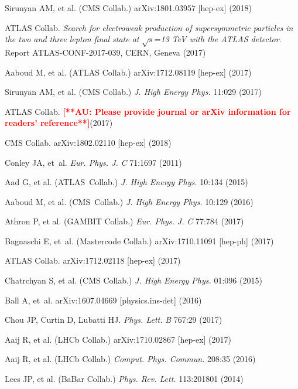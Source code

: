\documentclass{ar-1col}
\begin{document}
\begin{thebibliography}{175}
Sirunyan AM, et al. (CMS Collab.) arXiv:1801.03957 [hep-ex] (2018)

ATLAS Collab. \textit{Search for electroweak production of supersymmetric particles in the two and three lepton final state at} $\sqrt{s}$=\textit{13 TeV with the ATLAS detector}.
Report ATLAS-CONF-2017-039, CERN, Geneva (2017)

Aaboud M, et al. ({ATLAS Collab}.) arXiv:1712.08119 [hep-ex] (2017)

{Sirunyan AM, et al. (CMS Collab}.) \textit{J. High Energy Phys.} 11:029 (2017)

{ATLAS Collab}.  \textbf{\textcolor{red}{[**AU: Please provide journal or arXiv information for readers' reference**]}}(2017)

{CMS Collab}. arXiv:1802.02110 [hep-ex] (2018)

Conley JA, et~al. \textit{Eur. Phys. J.} \textit{C} 71:1697 (2011)

{Aad G, et al. (ATLAS~Collab}.) \textit{J. High Energy Phys.} 10:134 (2015)

{Aaboud M, et al. (CMS~Collab.)} \textit{J. High Energy Phys.} 10:129 (2016)

{Athron P, et al. (GAMBIT Collab}.) \textit{Eur. Phys. J.} \textit{C} 77:784 (2017)

Bagnaschi E, et~al. (Mastercode Collab.) arXiv:1710.11091 [hep-ph] (2017)

{ATLAS Collab}. arXiv:1712.02118 [hep-ex] (2017)

{Chatrchyan S, et al. (CMS Collab}.) \textit{J. High Energy Phys.} 01:096 (2015)

Ball A, et~al. arXiv:1607.04669 [physics.ins-det] (2016)

Chou JP, Curtin D, Lubatti HJ. \textit{Phys. Lett.} \textit{B} 767:29 (2017)

{Aaij R, et al. (LHCb Collab}.) arXiv:1710.02867 [hep-ex] (2017)

{Aaij R, et al. (LHCb Collab}.) \textit{Comput. Phys. Commun.} 208:35 (2016)

{Lees JP, et al. (BaBar Collab}.) \textit{Phys. Rev. Lett.} 113:201801 (2014)


\end{thebibliography}
\end{document}
